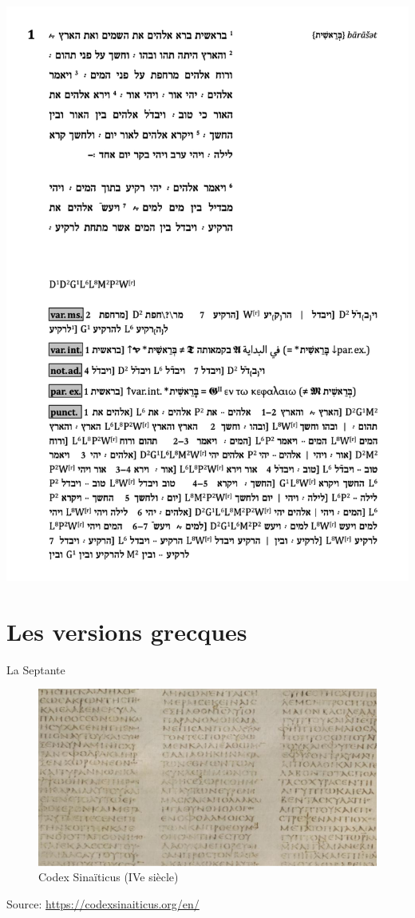 \documentclass[11pt]{beamer}
\begin{document}
\begin{frame}
\begin{minipage}{0.48\textwidth}
    \includegraphics[width=\textwidth]{img/sam_gen_1.png}
\end{minipage}
\end{frame}

\section{Les versions grecques}
\begin{frame}{La Septante}
    \begin{figure}
        \centering
        \includegraphics[width=1\linewidth]{img/Synaiticus.png}
        \caption{Codex Sinaïticus (IVe siècle)}
    \end{figure}
    \tiny{Source: \href{https://codexsinaiticus.org/en/}{https://codexsinaiticus.org/en/}}
\end{frame}
\end{document}
